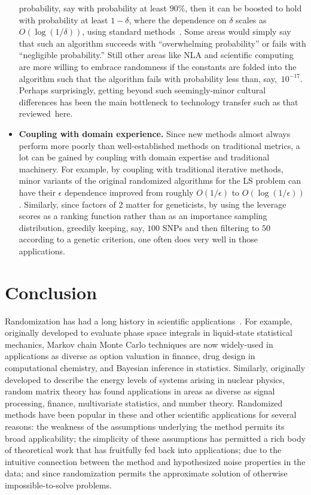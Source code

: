 \documentclass[twoside]{article}
\begin{document}
\begin{itemize}
probability, say with probability at least $90\%$, then it can be boosted 
to hold with probability at least $1-\delta$, where the dependence on 
$\delta$ scales as $O(\log(1/\delta))$, using standard 
methods~\cite{MotwaniRaghavan95}.
Some areas would simply say that such an algorithm succeeds with 
``overwhelming probability'' or fails with ``negligible probability.''
Still other areas like NLA and scientific computing are more willing to 
embrace randomness if the constants are folded into the algorithm such that 
the algorithm fails with probability less than, say,~$10^{-17}$.
Perhaps surprisingly, getting beyond such seemingly-minor cultural 
differences has been the main bottleneck to technology transfer such as that 
reviewed~here.
\item
\textbf{Coupling with domain experience.}
Since new methods almost always perform more poorly than well-established 
methods on traditional metrics, a lot can be gained by coupling with domain
expertise and traditional machinery.
For example, by coupling with traditional iterative methods, minor variants 
of the original randomized algorithms for the LS problem can have their 
$\epsilon$ dependence improved from roughly $O(1/\epsilon)$ to 
$O(\log(1/\epsilon))$.
Similarly, since factors of $2$ matter for geneticists, by using the 
leverage scores as a ranking function rather than as an importance sampling 
distribution, greedily keeping, say, $100$ SNPs and then filtering to $50$ 
according to a genetic criterion, one often does very well in those 
applications.
\end{itemize}


\section{Conclusion}
\label{sxn:conclusion}

Randomization has had a long history in scientific 
applications~\cite{HamHan64,Met53}.
For example, originally developed to evaluate phase space integrals in 
liquid-state statistical mechanics, Markov chain Monte Carlo techniques 
are now widely-used in applications as diverse as option valuation in 
finance, drug design in computational chemistry, and Bayesian inference
in statistics.
Similarly, originally developed to describe the energy levels of systems
arising in nuclear physics, random matrix theory has found applications 
in areas as diverse as signal processing, finance, multivariate 
statistics,  and number theory. 
Randomized methods have been popular in these and other scientific 
applications for several reasons:
the weakness of the assumptions underlying the method permits its broad 
applicability; 
the simplicity of these assumptions has permitted a rich body of 
theoretical work that has fruitfully fed back into applications; 
due to the intuitive connection between the method and hypothesized noise 
properties in the data; and
since randomization permits the approximate solution of otherwise
impossible-to-solve problems.
\end{document}
